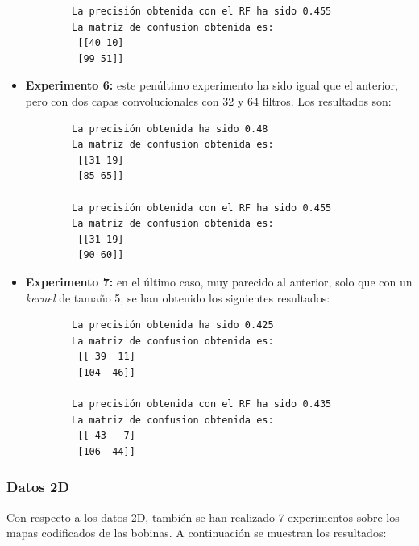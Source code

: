 \begin{itemize}
\begin{verbatim}
        La precisión obtenida con el RF ha sido 0.455
        La matriz de confusion obtenida es:
         [[40 10]
         [99 51]]
    \end{verbatim}
    \item \textbf{Experimento 6:} este penúltimo experimento ha sido igual que el anterior, pero con dos capas convolucionales con 32 y 64 filtros. Los resultados son:
    \begin{verbatim}
        La precisión obtenida ha sido 0.48
        La matriz de confusion obtenida es:
         [[31 19]
         [85 65]]
        
        La precisión obtenida con el RF ha sido 0.455
        La matriz de confusion obtenida es:
         [[31 19]
         [90 60]]
    \end{verbatim}
    \item \textbf{Experimento 7:} en el último caso, muy parecido al anterior, solo que con un \emph{kernel} de tamaño 5, se han obtenido los siguientes resultados:
    \begin{verbatim}
        La precisión obtenida ha sido 0.425
        La matriz de confusion obtenida es:
         [[ 39  11]
         [104  46]]
        
        La precisión obtenida con el RF ha sido 0.435
        La matriz de confusion obtenida es:
         [[ 43   7]
         [106  44]]
    \end{verbatim}
\end{itemize}

\subsubsection{Datos 2D}
Con respecto a los datos 2D, también se han realizado 7 experimentos sobre los mapas codificados de las bobinas. A continuación se muestran los resultados:

